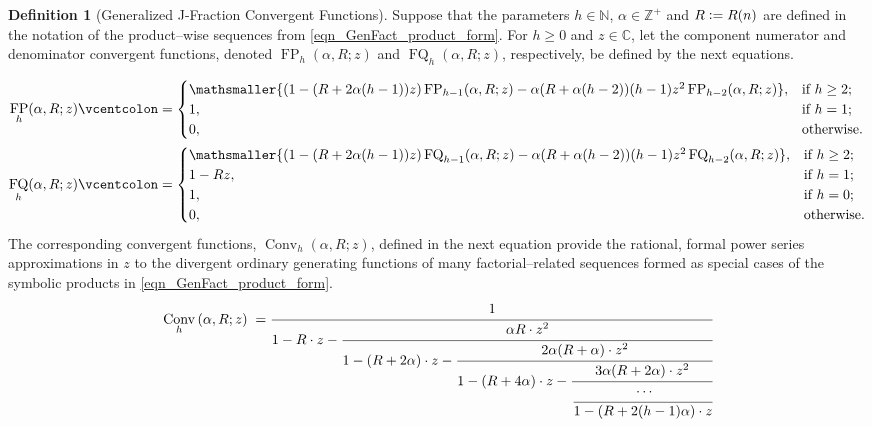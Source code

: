 \documentclass[12pt,reqno]{article}
\renewenvironment{subequations}{%
  \refstepcounter{equation}%
  \edef\theparentequation{\theequation}%
  \setcounter{parentequation}{\value{equation}}%
  \setcounter{equation}{0}%
  \def\theequation{\theparentequation.\alph{equation}}%
  \ignorespaces
}{%
  \setcounter{equation}{\value{parentequation}}%
  \ignorespacesafterend
}
\numberwithin{sfootnote}{section}
\numberwithin{equation}{section}
\theoremstyle{plain}
\theoremstyle{definition}
\newtheorem{definition}[theorem]{Definition}
\theoremstyle{remark}
\newcommand{\defequals}{\ensuremath{\vcentcolon=}}
\newcommand{\StartGroupingSubEquations}{\begin{subequations}}
\newcommand{\EndGroupingSubEquations}{\end{subequations}}
\newcommand{\ConvGF}[4]{\ensuremath{\Conv_{#1}\left(#2, #3; #4\right)}}
\DeclareMathOperator{\FP}{FP}
\DeclareMathOperator{\FQ}{FQ}
\DeclareMathOperator{\Conv}{Conv}
\begin{document}
\begin{definition}[Generalized J-Fraction Convergent Functions] 
\label{def_GenConvFns_PFact_Phz_eqn_QFact_Qhz-defs_intro_v1} 
Suppose that the parameters 
$h \in \mathbb{N}$, $\alpha \in \mathbb{Z}^{+}$ and $R \defequals R(n)$ 
are defined in the notation of the product--wise sequences from 
\eqref{eqn_GenFact_product_form}. 
For $h \geq 0$ and $z \in \mathbb{C}$, let the component 
numerator and denominator convergent functions, denoted  
$\FP_h(\alpha, R; z)$ and $\FQ_h(\alpha, R; z)$, respectively, 
be defined by the next equations.
\StartGroupingSubEquations 
\begin{align} 
\label{eqn_PFact_Phz} 
\FP_h(\alpha, R; z) & \defequals 
     \begin{cases} 
     \mathsmaller{(1-(R+2\alpha(h-1))z)\FP_{h-1}(\alpha, R; z)- 
     \alpha(R+\alpha(h-2))(h-1) z^2 \FP_{h-2}(\alpha, R; z)}, & 
     \text{if $h \geq 2$;} \\ 
     1, & \text{if $h = 1$;} \\ 
     0, & \text{otherwise.} 
     \end{cases} \\ 
\label{eqn_QFact_Qhz} 
\FQ_h(\alpha, R; z) & \defequals 
     \begin{cases} 
     \mathsmaller{(1-(R+2\alpha(h-1))z)\FQ_{h-1}(\alpha, R; z)- 
     \alpha(R+\alpha(h-2))(h-1) z^2 \FQ_{h-2}(\alpha, R; z)}, & 
     \text{if $h \geq 2$;} \\ 
     1-Rz, & \text{if $h = 1$;} \\ 
     1, & \text{if $h = 0$;} \\ 
     0, & \text{otherwise.} 
     \end{cases} 
\end{align} 
\EndGroupingSubEquations 
The corresponding convergent functions, 
$\ConvGF{h}{\alpha}{R}{z}$, defined in the 
next equation provide the 
rational, formal power series approximations in $z$ to the 
divergent ordinary generating functions of many factorial--related sequences 
formed as special cases of the symbolic products in 
\eqref{eqn_GenFact_product_form}. 
\begin{align} 
\notag 
\ConvGF{h}{\alpha}{R}{z} & \phantom{:} = 
     \cfrac{1}{1 - R \cdot z - 
     \cfrac{\alpha R \cdot z^2}{ 
            1 - (R+2\alpha) \cdot z -
     \cfrac{2\alpha (R + \alpha) \cdot z^2}{ 
            1 - (R + 4\alpha) \cdot z - 
     \cfrac{3\alpha (R + 2\alpha) \cdot z^2}{ 
     \cfrac{\cdots}{1 - (R + 2 (h-1) \alpha) \cdot z}}}}} \\ 

\end{align}
\end{definition}
\end{document}
